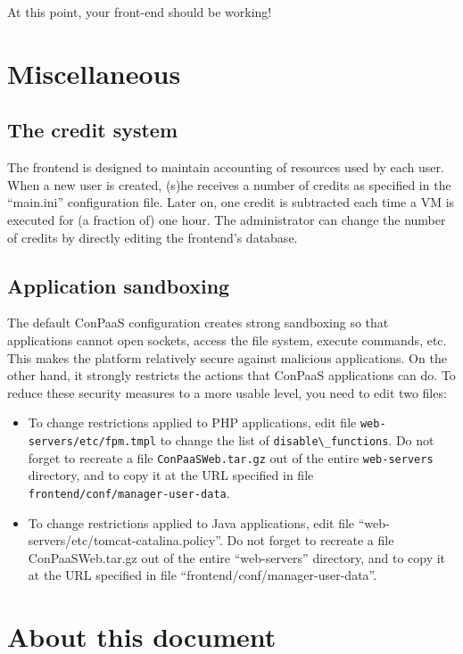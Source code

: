 \documentclass[10pt]{article}
\begin{document}
At this point, your front-end should be working!

\section{Miscellaneous}
\label{sec:misc}

\subsection{The credit system}

The frontend is designed to maintain accounting of resources used by
each user. When a new user is created, (s)he receives a number of
credits as specified in the ``main.ini'' configuration file. Later on,
one credit is subtracted each time a VM is executed for (a fraction
of) one hour. The administrator can change the number of credits by
directly editing the frontend's database. 

\subsection{Application sandboxing}

The default ConPaaS configuration creates strong sandboxing so that
applications cannot open sockets, access the file system, execute
commands, etc. This makes the platform relatively secure against
malicious applications. On the other hand, it strongly restricts the
actions that ConPaaS applications can do. To reduce these security
measures to a more usable level, you need to edit two files:

\begin{itemize}
\item To change restrictions applied to PHP applications, edit file
  \verb+web-servers/etc/fpm.tmpl+ to change the list of
  \verb+disable\_functions+. Do not forget to recreate a file
  \verb+ConPaaSWeb.tar.gz+ out of the entire \verb+web-servers+
  directory, and to copy it at the URL specified in file
  \verb+frontend/conf/manager-user-data+.
\item To change restrictions applied to Java applications, edit file
  ``web-servers/etc/tomcat-catalina.policy''. Do not forget to
  recreate a file ConPaaSWeb.tar.gz out of the entire ``web-servers''
  directory, and to copy it at the URL specified in file
  ``frontend/conf/manager-user-data''.
\end{itemize}

\section{About this document}
\label{sec:about}
\end{document}
